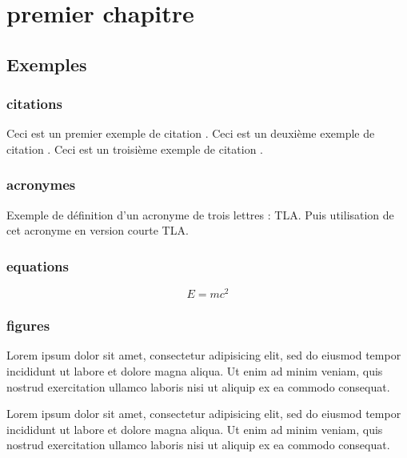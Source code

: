 \chapter{premier chapitre}

\section{Exemples}

\subsection{citations}

Ceci est un premier exemple de citation \cite{RN3}. Ceci est un deuxième exemple de citation \citep{RN4}. Ceci est un troisième exemple de citation \citet{RN5}.

\subsection{acronymes}

Exemple de définition d'un acronyme de trois lettres : \ac{TLA}. Puis utilisation de cet acronyme en version courte \acs{TLA}.

\subsection{equations}

\begin{equation}
E=mc^2
\end{equation}

\subsection{figures}

Lorem ipsum dolor sit amet, consectetur adipisicing elit, sed do eiusmod
tempor incididunt ut labore et dolore magna aliqua. Ut enim ad minim veniam,
quis nostrud exercitation ullamco laboris nisi ut aliquip ex ea commodo
consequat.

Lorem ipsum dolor sit amet, consectetur adipisicing elit, sed do eiusmod
tempor incididunt ut labore et dolore magna aliqua. Ut enim ad minim veniam,
quis nostrud exercitation ullamco laboris nisi ut aliquip ex ea commodo
consequat.


